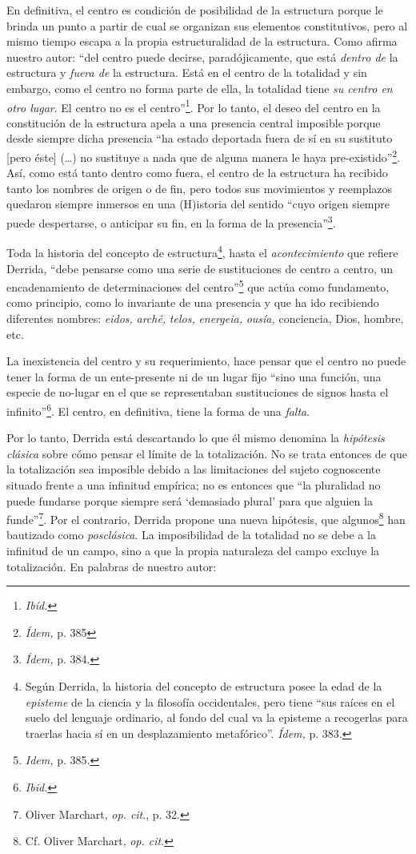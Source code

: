 En definitiva, el centro es condición de posibilidad de la estructura porque le brinda un punto a partir de cual se organizan sus elementos constitutivos, pero al mismo tiempo escapa a la propia estructuralidad de la estructura. Como afirma nuestro autor: \enquote{del centro puede decirse, paradójicamente, que está \emph{dentro de} la estructura y \emph{fuera de} la estructura. Está en el centro de la totalidad y sin embargo, como el centro no forma parte de ella, la totalidad tiene \emph{su centro en otro lugar}. El centro no es el centro}\footnote{\emph{Ibíd.}}. Por lo tanto, el deseo del centro en la constitución de la estructura apela a una presencia central imposible porque desde siempre dicha presencia \enquote{ha estado deportada fuera de sí en su sustituto {[}pero éste{]} (\dots) no sustituye a nada que de alguna manera le haya pre-existido}\footnote{\emph{Ídem,} p. 385}. Así, como está tanto dentro como fuera, el centro de la estructura ha recibido tanto los nombres de origen o de fin, pero todos sus movimientos y reemplazos quedaron siempre inmersos en una (H)istoria del sentido \enquote{cuyo origen siempre puede despertarse, o anticipar su fin, en la forma de la presencia}\footnote{\emph{Ídem,} p. 384.}.

Toda la historia del concepto de estructura\footnote{Según Derrida, la historia del concepto de estructura posee la edad de la \emph{episteme} de la ciencia y la filosofía occidentales, pero tiene \enquote{sus raíces en el suelo del lenguaje ordinario, al fondo del cual va la episteme a recogerlas para traerlas hacia sí en un desplazamiento metafórico}. \emph{Ídem,} p. 383.}, hasta el \emph{acontecimiento} que refiere Derrida, \enquote{debe pensarse como una serie de sustituciones de centro a centro, un encadenamiento de determinaciones del centro}\footnote{\emph{Idem,} p. 385.} que actúa como fundamento, como principio, como lo invariante de una presencia y que ha ido recibiendo diferentes nombres: \emph{eidos,} \emph{arché,} \emph{telos,} \emph{energeia,} \emph{ousía,} conciencia, Dios, hombre, etc.

La inexistencia del centro y su requerimiento, hace pensar que el centro no puede tener la forma de un ente-presente ni de un lugar fijo \enquote{sino una función, una especie de no-lugar en el que se representaban sustituciones de signos hasta el infinito}\footnote{\emph{Ibid.}}. El centro, en definitiva, tiene la forma de una \emph{falta}.

Por lo tanto, Derrida está descartando lo que él mismo denomina la \emph{hipótesis clásica} sobre cómo pensar el límite de la totalización. No se trata entonces de que la totalización sea imposible debido a las limitaciones del sujeto cognoscente situado frente a una infinitud empírica; no es entonces que \enquote{la pluralidad no puede fundarse porque siempre será \enquote{demasiado plural} para que alguien la funde}\footnote{Oliver Marchart, \emph{op. cit}., p. 32.}. Por el contrario, Derrida propone una nueva hipótesis, que algunos\footnote{Cf. Oliver Marchart, \emph{op. cit}.} han bautizado como \emph{posclásica}. La imposibilidad de la totalidad no se debe a la infinitud de un campo, sino a que la propia naturaleza del campo excluye la totalización. En palabras de nuestro autor:

